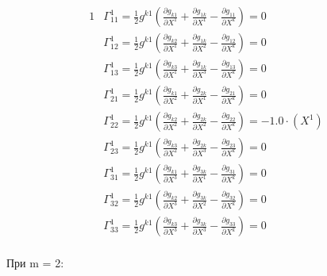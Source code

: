 \documentclass{article}
\begin{document}
\begin{alignat*}{1}
  & \Gamma^1_{11} = \frac{1}{2}g^{k1}(\frac{\partial g_{k1}}{\partial X^1} + \frac{\partial g_{1k}}{\partial X^1} - \frac{\partial g_{11}}{\partial X^k}) = 0 \\
  & \Gamma^1_{12} = \frac{1}{2}g^{k1}(\frac{\partial g_{k2}}{\partial X^1} + \frac{\partial g_{1k}}{\partial X^2} - \frac{\partial g_{12}}{\partial X^k}) = 0 \\
  & \Gamma^1_{13} = \frac{1}{2}g^{k1}(\frac{\partial g_{k3}}{\partial X^1} + \frac{\partial g_{1k}}{\partial X^3} - \frac{\partial g_{13}}{\partial X^k}) = 0 \\
  & \Gamma^1_{21} = \frac{1}{2}g^{k1}(\frac{\partial g_{k1}}{\partial X^2} + \frac{\partial g_{2k}}{\partial X^1} - \frac{\partial g_{21}}{\partial X^k}) = 0 \\
  & \Gamma^1_{22} = \frac{1}{2}g^{k1}(\frac{\partial g_{k2}}{\partial X^2} + \frac{\partial g_{2k}}{\partial X^2} - \frac{\partial g_{22}}{\partial X^k}) = -1.0\cdot (X^1) \\
  & \Gamma^1_{23} = \frac{1}{2}g^{k1}(\frac{\partial g_{k3}}{\partial X^2} + \frac{\partial g_{2k}}{\partial X^3} - \frac{\partial g_{23}}{\partial X^k}) = 0 \\
  & \Gamma^1_{31} = \frac{1}{2}g^{k1}(\frac{\partial g_{k1}}{\partial X^3} + \frac{\partial g_{3k}}{\partial X^1} - \frac{\partial g_{31}}{\partial X^k}) = 0 \\
  & \Gamma^1_{32} = \frac{1}{2}g^{k1}(\frac{\partial g_{k2}}{\partial X^3} + \frac{\partial g_{3k}}{\partial X^2} - \frac{\partial g_{32}}{\partial X^k}) = 0 \\
  & \Gamma^1_{33} = \frac{1}{2}g^{k1}(\frac{\partial g_{k3}}{\partial X^3} + \frac{\partial g_{3k}}{\partial X^3} - \frac{\partial g_{33}}{\partial X^k}) = 0 
\end{alignat*}\\
При m = 2:\\
\end{document}
